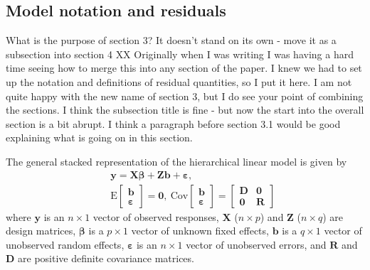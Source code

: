 \documentclass[12pt]{article} %
\newcommand{\hh}[1]{{\color{orange} #1}}
\newcommand{\al}[1]{{\color{red} #1}}
\newcommand{\E}{\ensuremath{\mathrm{E}}}
\newcommand{\cov}{\ensuremath{\mathrm{Cov}}}
\begin{document}
\subsection{Model notation and residuals}\label{sec:resid}
\hh{What is the purpose of section 3? It doesn't stand on its own - move it as a subsection into section 4} \al{XX Originally when I was writing I was having a hard time seeing how to merge this into any section of the paper. I knew we had to set up the notation and definitions of residual quantities, so I put it here. I am not quite happy with the new name of section 3, but I do see your point of combining the sections.}
\hh{I think the subsection title is fine - but now the start into the overall section is a bit abrupt.  I think a paragraph before section 3.1 would be good explaining what is going on in this section. }


The general stacked representation of the hierarchical linear model is given by
%
\begin{eqnarray}\label{eq:hlm}
 && \bm{y} = \bm{X \beta} + \bm{Z b} + \bm{\varepsilon}, \\ \nonumber
 && \E \begin{bmatrix} \bm{b} \\ \bm{\varepsilon} \end{bmatrix} = \bm{0}, 
 \ \cov \begin{bmatrix} \bm{b} \\ \bm{\varepsilon} \end{bmatrix} = 
  	\begin{bmatrix} \bm{D} & \bm{0}\\ \bm{0} & \bm{R} \end{bmatrix}
\end{eqnarray}
%
where $\bm{y}$ is an $n \times 1$ vector of observed responses, $\bm{X}$ ($n \times p$) and $\bm{Z}$ ($n \times q$) are design matrices, $\bm{\beta}$ is a $p \times 1$ vector of unknown fixed effects, $\bm{b}$ is a $q \times 1$ vector of unobserved random effects, $\bm{\varepsilon}$ is an $n \times 1$ vector of unobserved errors, and $\bm{R}$ and $\bm{D}$ are positive definite covariance matrices.
\end{document}
